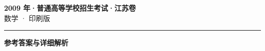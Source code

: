 \documentclass[zihao=5, a4paper]{ctexart}
\begin{document}
\begin{center}
  {\Large\bfseries 2009 年·普通高等学校招生考试·江苏卷}\\[4pt]
  {\large 数学 · 印刷版}
\end{center}
\medskip
{}

\par\bigskip\hrule\bigskip
{}
\begin{center}{\large\bfseries 参考答案与详细解析}\end{center}
\smallskip

\end{document}
